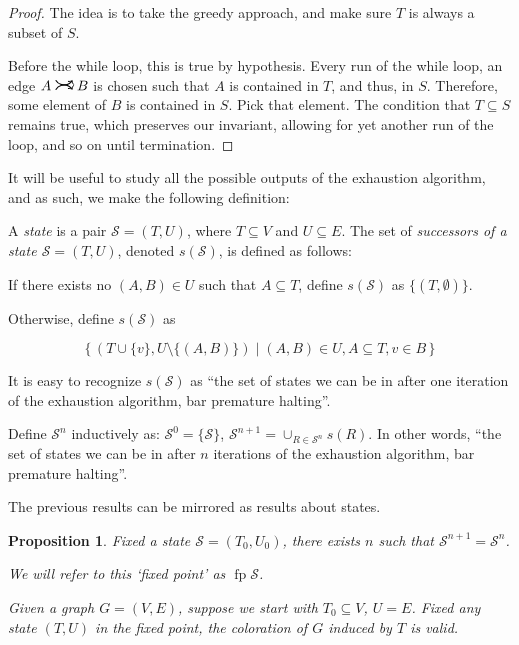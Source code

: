 \documentclass[11pt]{article}
\newcommand{\cS}{\mathcal{S}}
\DeclareMathOperator{\fp}{fp}
\newcommand{\rightcurvearrow}{
\mathrel{
  \begin{tikzpicture}[scale=0.8]
    \draw[thick,->] (0,1ex) arc (30:150:-2ex);
    \draw[thick,->] (0,-1ex) arc (150:30:2ex);
  \end{tikzpicture}
}
}
\newtheorem{prop}{Proposition}
\begin{document}
\begin{proof}
The idea is to take the greedy approach, and make sure $T$ is always a subset of  $S$.

Before the while loop, this is true by hypothesis. Every run of the while loop, an edge $A \rightcurvearrow B$ is chosen such that $A$ is contained in $T$, and thus, in $S$. Therefore, some element of $B$ is contained in $S$. Pick that element. The condition that $T \subseteq S$ remains true, which preserves our invariant, allowing for yet another run of the loop, and so on until termination.
\end{proof}

It will be useful to study all the possible outputs of the exhaustion algorithm, and as such, we make the following definition:

A \emph{state} is a pair $\cS = (T,U)$, where $T \subseteq V$ and $U \subseteq E$. The set of \emph{successors of a state $\cS = (T,U)$}, denoted $s(\cS)$, is defined as follows:

If there exists no $(A,B) \in U$ such that $A \subseteq T$, define $s(\cS)$ as $\{(T, \emptyset)\}$.

Otherwise, define $s(\cS)$ as

\[ \{ \, (T \cup \{v\}, U \setminus \{(A,B)\}) \mid (A,B) \in U, A \subseteq T, v \in B \, \}\]

It is easy to recognize $s(\cS)$ as ``the set of states we can be in after one iteration of the exhaustion algorithm, bar premature halting''.

Define $\cS^n$ inductively as: $\cS^0 = \{\cS\}$, $\cS^{n+1} = \cup_{R \in \cS^n} s(R)$. In other words, ``the set of states we can be in after $n$ iterations of the exhaustion algorithm, bar premature halting''.

The previous results can be mirrored as results about states.

\begin{prop} \label{statesfixedpointvalid}
Fixed a state $\cS = (T_0, U_0)$, there exists $n$ such that $\cS^{n+1} = \cS^n$.

We will refer to this `fixed point' as $\fp \cS$.

Given a graph $G = (V,E)$, suppose we start with $T_0 \subseteq V$, $U = E$. Fixed any state $(T,U)$ in the fixed point, the coloration of $G$ induced by $T$ is valid.
\end{prop}
\end{document}
